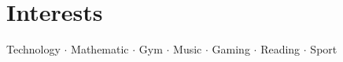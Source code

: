 \section{Interests}
\begin{center}
    Technology $\cdot$ Mathematic $\cdot$ Gym  $\cdot$ Music $\cdot$ Gaming $\cdot$ Reading $\cdot$ Sport
\end{center}

